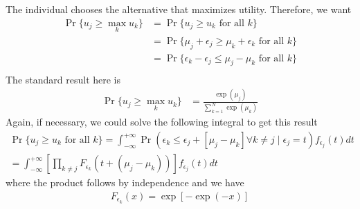 
The individual chooses the alternative that maximizes utility. Therefore, we want
\begin{align*}
    \operatorname{Pr}\{u_j \geq \max _{k} u_k \} &=
    \operatorname{Pr}\{u_j \geq u_k \text { for all } k \} \\
     &= \operatorname{Pr}\{\mu_j+\epsilon_j \geq \mu_k+\epsilon_k \text { for all } k \} \\
     &= \operatorname{Pr}\{\epsilon_k-\epsilon_j \leq \mu_j-\mu_k \text { for all } k \} \\
\end{align*}
The standard result here is
\begin{align*}
    \operatorname{Pr}\{u_j \geq \max _{k} u_k \} &=
    \frac{\exp \left(\mu_j\right)}{\sum_{k=1}^N \exp \left(\mu_k\right)}
\end{align*}
Again, if necessary, we could solve the following integral to get this result
\begin{align*}
    \operatorname{Pr}\{u_j \geq u_k \text { for all } k \} 
=\int_{-\infty}^{+\infty} \operatorname{Pr}\left(\epsilon_k \leq \epsilon_j+\left[\mu_j-\mu_k\right] \forall k \neq j \mid \epsilon_j=t\right) f_{\epsilon_j}(t) d t \\
=\int_{-\infty}^{+\infty}\left[\prod_{k \neq j} F_{\epsilon_k}\left(t+\left(\mu_j-\mu_k\right)\right)\right] f_{\epsilon_j}(t) d t
\end{align*}
where the product follows by independence and we have
\begin{align*}
F_{\epsilon_k}(x)=\exp [-\exp (-x)]
\end{align*}


